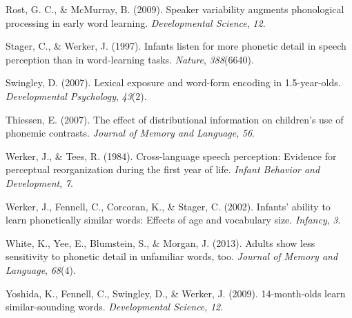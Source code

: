 \documentclass[10pt, letterpaper]{article}
\begin{document}
\hypertarget{ref-rost2009}{}
Rost, G. C., \& McMurray, B. (2009). Speaker variability augments
phonological processing in early word learning. \emph{Developmental
Science}, \emph{12}.

\hypertarget{ref-stager1997}{}
Stager, C., \& Werker, J. (1997). Infants listen for more phonetic
detail in speech perception than in word-learning tasks. \emph{Nature},
\emph{388}(6640).

\hypertarget{ref-swingley2007}{}
Swingley, D. (2007). Lexical exposure and word-form encoding in
1.5-year-olds. \emph{Developmental Psychology}, \emph{43}(2).

\hypertarget{ref-thiessen2007}{}
Thiessen, E. (2007). The effect of distributional information on
children's use of phonemic contrasts. \emph{Journal of Memory and
Language}, \emph{56}.

\hypertarget{ref-werker1984}{}
Werker, J., \& Tees, R. (1984). Cross-language speech perception:
Evidence for perceptual reorganization during the first year of life.
\emph{Infant Behavior and Development}, \emph{7}.

\hypertarget{ref-werker2002}{}
Werker, J., Fennell, C., Corcoran, K., \& Stager, C. (2002). Infants'
ability to learn phonetically similar words: Effects of age and
vocabulary size. \emph{Infancy}, \emph{3}.

\hypertarget{ref-white2013}{}
White, K., Yee, E., Blumstein, S., \& Morgan, J. (2013). Adults show
less sensitivity to phonetic detail in unfamiliar words, too.
\emph{Journal of Memory and Language}, \emph{68}(4).

\hypertarget{ref-yoshida2009}{}
Yoshida, K., Fennell, C., Swingley, D., \& Werker, J. (2009).
14-month-olds learn similar-sounding words. \emph{Developmental
Science}, \emph{12}.
\end{document}
